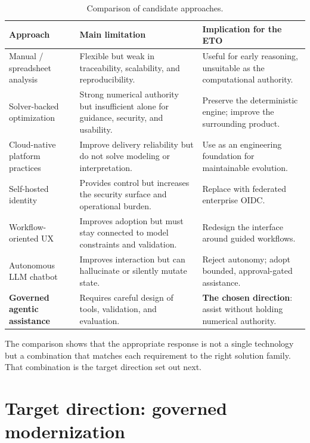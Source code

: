 \begin{table}[H]
  \centering
  \small
  \begin{tabularx}{\linewidth}{@{}>{\raggedright\arraybackslash}p{3.2cm} >{\raggedright\arraybackslash}X >{\raggedright\arraybackslash}X@{}}
    \toprule
    \textbf{Approach} & \textbf{Main limitation} & \textbf{Implication for the ETO} \\
    \midrule
    Manual / spreadsheet analysis & Flexible but weak in traceability, scalability,
      and reproducibility. & Useful for early reasoning, unsuitable as the
      computational authority. \\
    \addlinespace
    Solver-backed optimization & Strong numerical authority but insufficient alone
      for guidance, security, and usability. & Preserve the deterministic engine;
      improve the surrounding product. \\
    \addlinespace
    Cloud-native platform practices & Improve delivery reliability but do not solve
      modeling or interpretation. & Use as an engineering foundation for
      maintainable evolution. \\
    \addlinespace
    Self-hosted identity & Provides control but increases the security surface and
      operational burden. & Replace with federated enterprise OIDC. \\
    \addlinespace
    Workflow-oriented UX & Improves adoption but must stay connected to model
      constraints and validation. & Redesign the interface around guided workflows. \\
    \addlinespace
    Autonomous LLM chatbot & Improves interaction but can hallucinate or silently
      mutate state. & Reject autonomy; adopt bounded, approval-gated assistance. \\
    \addlinespace
    \textbf{Governed agentic assistance} & Requires careful design of tools,
      validation, and evaluation. & \textbf{The chosen direction}: assist without
      holding numerical authority. \\
    \bottomrule
  \end{tabularx}
  \caption{Comparison of candidate approaches.}
  \label{tab:benchmark}
\end{table}

The comparison shows that the appropriate response is not a single technology but
a combination that matches each requirement to the right solution family. That
combination is the target direction set out next.

\section{Target direction: governed modernization}
\label{sec:target}

